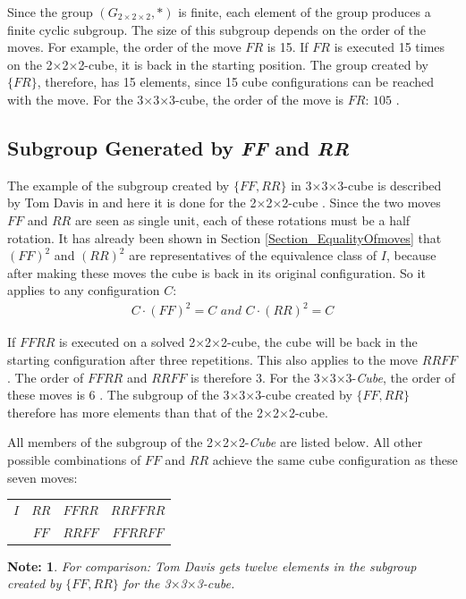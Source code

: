 \documentclass[12pt,a4paper]{article}
\theoremstyle{custom}
\newtheorem*{note}{Note:}
\newcommand{\Gtwo}{\ensuremath{G_{2\times 2\times 2}}}
\newcommand{\Ttwo}{2$\times$2$\times$2-}
\newcommand{\Tthree}{3$\times$3$\times$3-}
\begin{document}
Since the group $\left(\Gtwo, \scriptstyle*\right)$ is finite, each element of the group produces a finite cyclic subgroup. The size of this subgroup depends on the order of the moves. 
For example, the order of the move $FR$ is 15. If $FR$ is executed 15 times on the \Ttwo cube, it is back in the starting position.
The group created by $\{FR\}$, therefore, has 15 elements, since 15 cube configurations can be reached with the move. For the \Tthree cube, the order of the move is $FR$: $105$ \cite{TD}.

\subsection{Subgroup Generated by \textit{FF} and \textit{RR}}
\label{section_subgroupFFRR}

The example of the subgroup created by $\{ FF, RR \}$ in \Tthree cube is described by Tom Davis in \cite{TD} and here it is done for the \Ttwo cube .
Since the two moves $FF$ and $RR$ are seen as single unit, each of these rotations must be a half rotation.
It has already been shown in Section \ref{Section_EqualityOfmoves} that $(FF)^2$ and $(RR)^2$ are representatives of the equivalence class of $I$, because after making these moves the cube is back in its original configuration. So it applies to any configuration $C$:
\begin{align*}
C \cdot (FF)^2 = C \textit{ and } C \cdot (RR)^2 = C
\end{align*}

If $FFRR$ is executed on a solved \Ttwo cube, the cube will be back in the starting configuration after three repetitions. This also applies to the move $RRFF$. The order of $FFRR$ and $RRFF$ is therefore 3. For the \Tthree \textit{Cube}, the order of these moves is 6 \cite{TD}.
The subgroup of the \Tthree cube created by $\{ FF, RR \}$ therefore has more elements than that of the \Ttwo cube.

All members of the subgroup of the \Ttwo \textit{Cube} are listed below. All other possible combinations of $FF$ and $RR$ achieve the same cube configuration as these seven moves:
\begin{center}
\label{7move}
\centering
\begin{tabular}{c c c c}
$I$ & $RR$ & $FFRR$ & $RRFFRR$ \\
& $FF$ & $RRFF$ & $FFRRFF$ \\
\end{tabular}
\end{center}
\begin{note}
For comparison: Tom Davis gets twelve elements in the subgroup created by $\{ FF, RR \}$ for the \Tthree cube.
\end{note}
\end{document}
